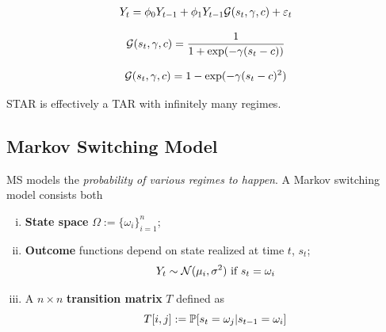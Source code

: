 \documentclass[11pt]{article}
\begin{document}
			\begin{example}
				\begin{gather}
					Y_t = \phi_0 Y_{t-1} + \phi_1 Y_{t-1} \mathcal{{G}}(s_t, \gamma, c) + \varepsilon_t
				\end{gather}
			\end{example}
			
			\begin{example}
				\begin{gather}
					\mathcal{{G}}(s_t, \gamma, c) = \frac{1}{1 + \exp(-\gamma(s_t - c))}
				\end{gather}
			\end{example}
			
			\begin{example}
				\begin{gather}
					\mathcal{{G}}(s_t, \gamma, c) = 1 - \exp(-\gamma (s_t - c)^2)
				\end{gather}
			\end{example}
			
			\begin{remark}
				STAR is effectively a TAR with infinitely many regimes.
			\end{remark}
		
		\subsection{Markov Switching Model}
			\begin{definition}
				MS models the \emph{probability of various regimes to happen}. A Markov switching model consists both
				\begin{enumerate}[(i)]
					\item \textbf{State space} $\Omega := \{\omega_i\}_{i=1}^n$;
					\item \textbf{Outcome} functions depend on state realized at time $t$, $s_t$;
						\begin{equation}
							Y_t \sim \mathcal{{N}}(\mu_i, \sigma^2) \text{{ if }} s_t = \omega_i
						\end{equation}
					\item A $n \times n$ \textbf{transition matrix} $T$ defined as
					\begin{equation}
						T[i, j] := \mathbb{P}[{s_t = \omega_j|s_{t-1} = \omega_i}] 
					\end{equation}
				\end{enumerate}
			\end{definition}
\end{document}
